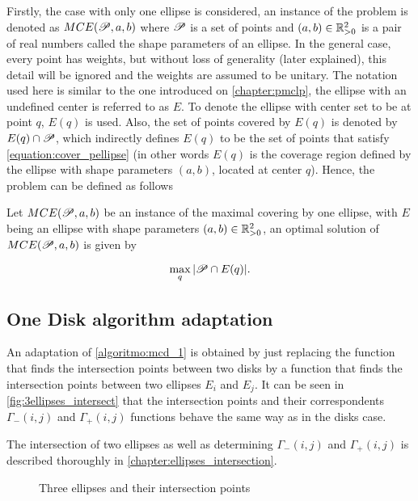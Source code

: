 Firstly, the case with only one ellipse is considered, an instance of the problem is denoted as $MCE(\mathscr{P}, a, b)$ where $\mathscr{P}$ is a set of points and $(a,b) \in \mathbb{R}_{>0}^2$ is a pair of real numbers called the shape parameters of an ellipse. 
In the general case, every point has weights, but without loss of generality (later explained), this detail will be ignored and the weights are assumed to be unitary.
The notation used here is similar to the one introduced on \autoref{chapter:pmclp}, the ellipse with an undefined center is referred to as $E$. To denote the ellipse with center set to be at point $q$, $E(q)$ is used. Also, the set of points covered by $E(q)$ is denoted by $E(q) \cap \mathscr{P}$, which indirectly defines $E(q)$ to be the set of points that satisfy \autoref{equation:cover_pellipse} (in other words $E(q)$ is the coverage region defined by the ellipse with shape parameters $(a,b)$, located at center $q$). Hence, the problem can be defined as follows

\begin{definicao}
Let $MCE(\mathscr{P}, a, b)$ be an instance of the maximal covering by one ellipse, with $E$ being an ellipse with shape parameters $(a,b) \in \mathbb{R}_{>0}^2$, an optimal solution of $MCE(\mathscr{P}, a, b)$ is given by

\begin{equation}
    \max_q |\mathscr{P} \cap E(q)|.
\end{equation}
\end{definicao}

\subsection{One Disk algorithm adaptation}

An adaptation of \autoref{algoritmo:mcd_1} is obtained by just replacing the function that finds the intersection points between two disks by a function that finds the intersection points between two ellipses $E_i$ and $E_j$.
It can be seen in \autoref{fig:3ellipses_intersect} that the intersection points and their correspondents $\Gamma_-(i,j)$ and $\Gamma_+(i,j)$ functions behave the same way as in the disks case.

The intersection of two ellipses as well as determining $\Gamma_-(i,j)$ and $\Gamma_+(i,j)$ is described thoroughly in \autoref{chapter:ellipses_intersection}. 


\begin{figure}[H]
\centering

    \caption{Three ellipses and their intersection points}
    
    \fautor
    \label{fig:3ellipses_intersect}
\end{figure}


